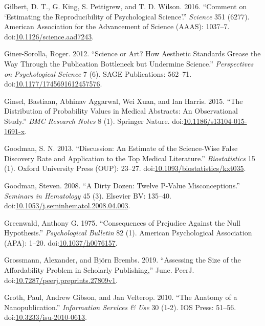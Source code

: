 \documentclass[a5paper]{book}
\begin{document}
\hypertarget{ref-doi:10.1126ux2fscience.aad7243}{}
Gilbert, D. T., G. King, S. Pettigrew, and T. D. Wilson. 2016. ``Comment
on `Estimating the Reproducibility of Psychological Science'.''
\emph{Science} 351 (6277). American Association for the Advancement of
Science (AAAS): 1037--7.
doi:\href{https://doi.org/10.1126/science.aad7243}{10.1126/science.aad7243}.

\hypertarget{ref-doi:10.1177ux2f1745691612457576}{}
Giner-Sorolla, Roger. 2012. ``Science or Art? How Aesthetic Standards
Grease the Way Through the Publication Bottleneck but Undermine
Science.'' \emph{Perspectives on Psychological Science} 7 (6). SAGE
Publications: 562--71.
doi:\href{https://doi.org/10.1177/1745691612457576}{10.1177/1745691612457576}.

\hypertarget{ref-doi:10.1186ux2fs13104-015-1691-x}{}
Ginsel, Bastiaan, Abhinav Aggarwal, Wei Xuan, and Ian Harris. 2015.
``The Distribution of Probability Values in Medical Abstracts: An
Observational Study.'' \emph{BMC Research Notes} 8 (1). Springer Nature.
doi:\href{https://doi.org/10.1186/s13104-015-1691-x}{10.1186/s13104-015-1691-x}.

\hypertarget{ref-doi:10.1093ux2fbiostatisticsux2fkxt035}{}
Goodman, S. N. 2013. ``Discussion: An Estimate of the Science-Wise False
Discovery Rate and Application to the Top Medical Literature.''
\emph{Biostatistics} 15 (1). Oxford University Press (OUP): 23--27.
doi:\href{https://doi.org/10.1093/biostatistics/kxt035}{10.1093/biostatistics/kxt035}.

\hypertarget{ref-doi:10.1053ux2fj.seminhematol.2008.04.003}{}
Goodman, Steven. 2008. ``A Dirty Dozen: Twelve P-Value Misconceptions.''
\emph{Seminars in Hematology} 45 (3). Elsevier BV: 135--40.
doi:\href{https://doi.org/10.1053/j.seminhematol.2008.04.003}{10.1053/j.seminhematol.2008.04.003}.

\hypertarget{ref-doi:10.1037ux2fh0076157}{}
Greenwald, Anthony G. 1975. ``Consequences of Prejudice Against the Null
Hypothesis.'' \emph{Psychological Bulletin} 82 (1). American
Psychological Association (APA): 1--20.
doi:\href{https://doi.org/10.1037/h0076157}{10.1037/h0076157}.

\hypertarget{ref-doi:10.7287ux2fpeerj.preprints.27809v1}{}
Grossmann, Alexander, and Björn Brembs. 2019. ``Assessing the Size of
the Affordability Problem in Scholarly Publishing,'' June. PeerJ.
doi:\href{https://doi.org/10.7287/peerj.preprints.27809v1}{10.7287/peerj.preprints.27809v1}.

\hypertarget{ref-doi:10.3233ux2fisu-2010-0613}{}
Groth, Paul, Andrew Gibson, and Jan Velterop. 2010. ``The Anatomy of a
Nanopublication.'' \emph{Information Services \& Use} 30 (1-2). IOS
Press: 51--56.
doi:\href{https://doi.org/10.3233/isu-2010-0613}{10.3233/isu-2010-0613}.
\end{document}
